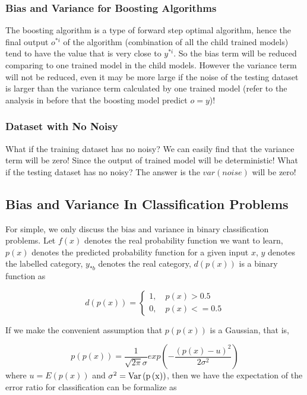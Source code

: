 \documentclass[runningheads,openany]{xhlPaper}
\begin{document}
\subsubsection{Bias and Variance for Boosting Algorithms}
The boosting algorithm is a type of forward step optimal algorithm, hence the final output $o^{*i}$ of the algorithm (combination of all the child trained models) tend to have the value that is very close to $y^{*i}$. So the bias term will be reduced comparing to one trained model in the child models. 
However the variance term will not be reduced, even it may be more large if the noise of the testing dataset is larger than the variance term calculated by one trained model (refer to the analysis in before that the boosting model predict $o=y$)!

\subsubsection{Dataset with No Noisy}
What if the training dataset has no noisy? 
We can easily find that the variance term will be zero! Since the output of trained model will be deterministic!
What if the testing dataset has no noisy?
The answer is the $var\left(noise\right)$ will be zero!

\subsection{Bias and Variance In Classification Problems}
For simple, we only discuss the bias and variance in binary classification problems.
Let $f\left(x\right)$ denotes the real probability function we want to learn, $p\left(x\right)$ denotes the predicted probability function for a given input $x$, $y$ denotes the labelled category, $y_{*b}$ denotes the real category, $d\left(p\left(x\right)\right)$ is a binary function as 

\begin{displaymath}
d\left ( p\left ( x \right ) \right) = \left\{ \begin{array}{*{20}{l}}
1,\quad p\left ( x \right ) > 0.5\\ 
0,\quad p\left ( x \right ) <= 0.5
\end{array}\right.
\end{displaymath}

If we make the convenient assumption that $p\left(p\left(x\right)\right)$ is a Gaussian, that is,

\begin{displaymath}
p\left(p\left(x\right)\right) = \frac{1}{\sqrt{2 \pi}\sigma }exp\left ( -\frac{\left ( p\left(x\right) - u \right )^2}{2\sigma ^2} \right )
\end{displaymath}
where $u = E\left(p\left(x\right)\right)$ and $\sigma ^2 = \rm{Var}\left(p\left(x\right)\right)$, then we have the expectation of the error ratio for classification can be formalize as
\end{document}
